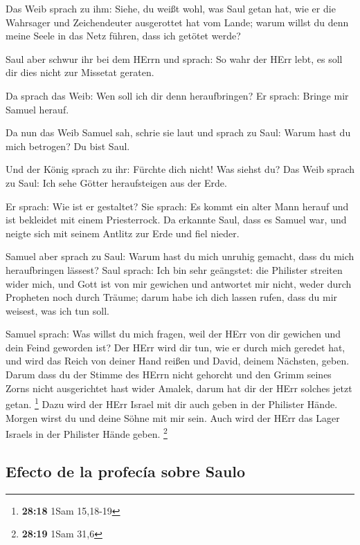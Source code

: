  Das Weib sprach zu ihm: Siehe, du weißt wohl, was Saul
getan hat, wie er die Wahrsager und Zeichendeuter ausgerottet hat vom
Lande; warum willst du denn meine Seele in das Netz führen, dass ich
getötet werde?

 Saul aber schwur ihr bei dem HErrn und sprach: So wahr
der HErr lebt, es soll dir dies nicht zur Missetat geraten.

 Da sprach das Weib: Wen soll ich dir denn heraufbringen?
Er sprach: Bringe mir Samuel herauf.

 Da nun das Weib Samuel sah, schrie sie laut und sprach
zu Saul: Warum hast du mich betrogen? Du bist Saul.

 Und der König sprach zu ihr: Fürchte dich nicht! Was
siehst du? Das Weib sprach zu Saul: Ich sehe Götter heraufsteigen aus
der Erde.

 Er sprach: Wie ist er gestaltet? Sie sprach: Es kommt
ein alter Mann herauf und ist bekleidet mit einem Priesterrock. Da
erkannte Saul, dass es Samuel war, und neigte sich mit seinem Antlitz
zur Erde und fiel nieder.

 Samuel aber sprach zu Saul: Warum hast du mich unruhig
gemacht, dass du mich heraufbringen lässest? Saul sprach: Ich bin sehr
geängstet: die Philister streiten wider mich, und Gott ist von mir
gewichen und antwortet mir nicht, weder durch Propheten noch durch
Träume; darum habe ich dich lassen rufen, dass du mir weisest, was ich
tun soll.

 Samuel sprach: Was willst du mich fragen, weil der HErr
von dir gewichen und dein Feind geworden ist?  Der HErr
wird dir tun, wie er durch mich geredet hat, und wird das Reich von
deiner Hand reißen und David, deinem Nächsten, geben. 
Darum dass du der Stimme des HErrn nicht gehorcht und den Grimm seines
Zorns nicht ausgerichtet hast wider Amalek, darum hat dir der HErr
solches jetzt getan. \footnote{\textbf{28:18} 1Sam 15,18-19}
 Dazu wird der HErr Israel mit dir auch geben in der
Philister Hände. Morgen wirst du und deine Söhne mit mir sein. Auch wird
der HErr das Lager Israels in der Philister Hände geben. \footnote{\textbf{28:19}
  1Sam 31,6}

\hypertarget{efecto-de-la-profecuxeda-sobre-saulo}{%
\subsection{Efecto de la profecía sobre
Saulo}\label{efecto-de-la-profecuxeda-sobre-saulo}}

